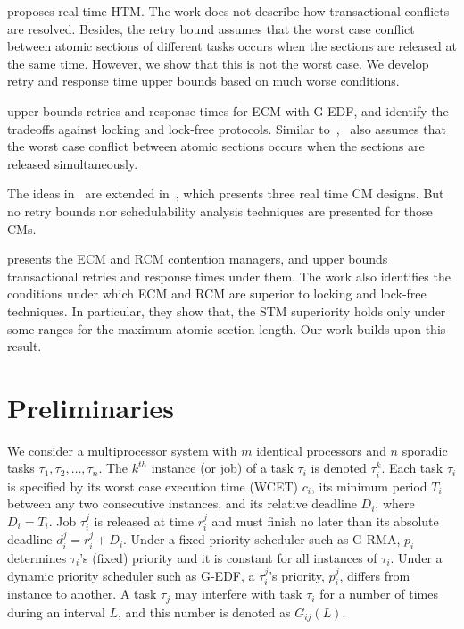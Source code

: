 \documentclass[conference]{sig-alternate}
\begin{document}
\cite{schoeberl2010rttm} proposes real-time HTM. The work does not describe how transactional conflicts are resolved. Besides, the retry bound assumes that the worst case conflict between atomic sections of different tasks occurs when the sections are released at the same time. However, we show that this is not the worst case. We develop retry and response time upper bounds based on much worse conditions.


\cite{key-1} upper bounds retries and response times for  ECM with G-EDF, and identify the tradeoffs against locking and lock-free protocols. Similar to~\cite{schoeberl2010rttm},~\cite{key-1} also assumes that the worst case conflict between atomic sections occurs when the sections are released simultaneously. 

The ideas in~\cite{key-1} are extended in~\cite{barrosmanaging}, which presents three real time CM designs. But no retry bounds nor schedulability analysis techniques are presented for those CMs. 

\cite{stmconcurrencycontrol:emsoft11} presents the ECM and RCM contention managers, and upper bounds transactional retries and response times under them. The work also identifies the conditions under which ECM and RCM are superior to locking and lock-free techniques. In particular, they show that, the STM superiority holds only under some ranges for the maximum atomic section length. Our work builds upon this result.

\section{Preliminaries}
\label{sec:model}

We consider a multiprocessor system with $m$ identical processors and $n$ sporadic tasks $\tau_1, \tau_2,\ldots, \tau_n$. The $k^{th}$ instance (or job) of a task $\tau_i$ is denoted $\tau_i^k$. Each task $\tau_i$ is specified by its worst case execution time (WCET) $c_i$, its minimum period $T_i$ between any two consecutive instances, and its relative deadline $D_i$, where $D_i=T_i$. Job $\tau_i^j$ is released at time $r_i^j$ and must finish no later than its absolute deadline $d_i^j=r_i^j+D_i$. Under a fixed priority scheduler such as G-RMA, $p_i$ determines $\tau_i$'s (fixed) priority and it is constant for all instances of $\tau_i$. Under a dynamic priority scheduler such as G-EDF, a $\tau_i^j$'s priority, $p_i^j$, differs from  instance to another. 
A task $\tau_j$ may interfere with task $\tau_i$ for a number of times during an interval $L$, and this number is denoted as $G_{ij}(L)$. 
\end{document}
